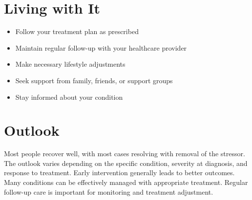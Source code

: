 \section{Living with It}
\begin{itemize}[noitemsep]
  \item Follow your treatment plan as prescribed
  \item Maintain regular follow-up with your healthcare provider
  \item Make necessary lifestyle adjustments
  \item Seek support from family, friends, or support groups
  \item Stay informed about your condition
\end{itemize}
\section{Outlook}
Most people recover well, with most cases resolving with removal of the stressor. The outlook varies depending on the specific condition, severity at diagnosis, and response to treatment. Early intervention generally leads to better outcomes. Many conditions can be effectively managed with appropriate treatment. Regular follow-up care is important for monitoring and treatment adjustment.
